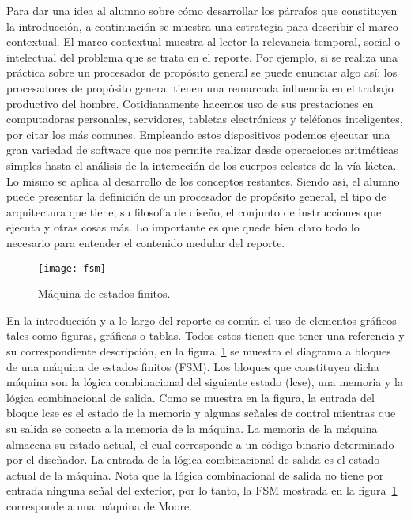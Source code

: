 \documentclass[12pt]{article}
\begin{document}
Para dar una idea al alumno sobre cómo desarrollar los párrafos que constituyen 
la introducción, a continuación se muestra una estrategia para describir el 
marco contextual. El marco contextual muestra al lector la relevancia temporal,
social o intelectual del problema que se trata en el reporte. Por ejemplo, si
se realiza una práctica sobre un procesador de propósito general se puede 
enunciar algo así: los procesadores de propósito general tienen una remarcada 
influencia en el trabajo productivo del hombre. Cotidianamente hacemos uso de 
sus prestaciones en computadoras personales, servidores, tabletas electrónicas 
y teléfonos inteligentes, por citar los más comunes. Empleando estos 
dispositivos podemos ejecutar una gran variedad de software que nos permite 
realizar desde operaciones aritméticas simples hasta el análisis de la 
interacción de los cuerpos celestes de la vía láctea. Lo mismo se aplica al 
desarrollo de los conceptos restantes. Siendo así, el alumno puede presentar 
la definición de un procesador de propósito general, el tipo de arquitectura 
que tiene, su filosofía de diseño, el conjunto de instrucciones que ejecuta y 
otras cosas más. Lo importante es que quede bien claro todo lo necesario para 
entender el contenido medular del reporte.

\begin{figure}[t] %
    \centering
    \texttt{[image: fsm]}
    \caption{Máquina de estados finitos.}
    \label{fig:fsm}
\end{figure}

En la introducción y a lo largo del reporte es común el uso de elementos 
gráficos tales como figuras, gráficas o tablas. Todos estos tienen que tener 
una referencia y su correspondiente descripción, \eg en la 
figura~\ref{fig:fsm} se muestra el diagrama a bloques de una máquina de estados 
finitos (FSM). Los bloques que constituyen dicha máquina son la lógica 
combinacional del siguiente estado (lcse), una memoria y la lógica combinacional 
de salida. Como se muestra en la figura, la entrada del bloque lcse es el estado 
de la memoria y algunas señales de control mientras que su salida se conecta a 
la memoria de la máquina. La memoria de la máquina almacena su estado actual, 
el cual corresponde a un código binario determinado por el diseñador. 
La entrada de la lógica combinacional de salida es el estado actual de la 
máquina. Nota que la lógica combinacional de salida no tiene por entrada ninguna 
señal del exterior, por lo tanto, la FSM mostrada en la figura~\ref{fig:fsm} 
corresponde a una máquina de Moore.
\end{document}
